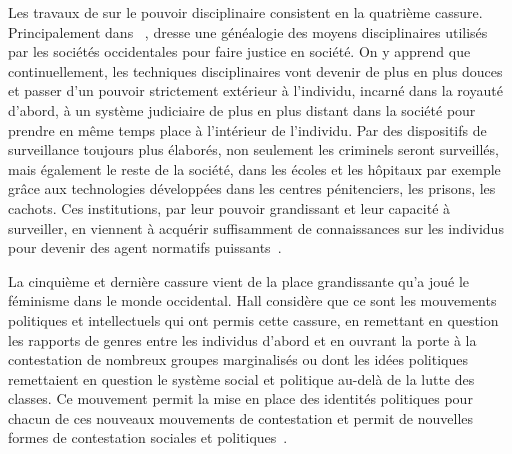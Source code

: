 Les travaux de \citeauthor{Foucault2004a} sur le pouvoir disciplinaire consistent en la quatrième cassure. 
Principalement dans ~\citeyearpar{Foucault2004a}, \citeauthor{Foucault2004a} dresse une généalogie des moyens disciplinaires utilisés par les sociétés occidentales pour faire justice en société. 
On y apprend que continuellement, les techniques disciplinaires vont devenir de plus en plus douces et passer d'un pouvoir strictement extérieur à l'individu, incarné dans la royauté d'abord, à un système judiciaire de plus en plus distant dans la société pour prendre en même temps place à l'intérieur de l'individu. 
Par des dispositifs de surveillance toujours plus élaborés, non seulement les criminels seront surveillés, mais également le reste de la société, dans les écoles et les hôpitaux par exemple grâce aux technologies développées dans les centres pénitenciers, les prisons, les cachots. 
Ces institutions, par leur pouvoir grandissant et leur capacité à surveiller, en viennent à acquérir suffisamment de connaissances sur les individus pour devenir des agent normatifs puissants~\citep[608--609]{Hall1996a}.

La cinquième et dernière cassure vient de la place grandissante qu'a joué le féminisme dans le monde occidental. 
Hall considère que ce sont les mouvements politiques et intellectuels qui ont permis cette cassure, en remettant en question les rapports de genres entre les individus d'abord et en ouvrant la porte à la contestation de nombreux groupes marginalisés ou dont les idées politiques remettaient en question le système social et politique au-delà de la lutte des classes. 
Ce mouvement permit la mise en place des identités politiques pour chacun de ces nouveaux mouvements de contestation et permit de nouvelles formes de contestation sociales et politiques~\citeyearpar[610]{Hall1996a}.


